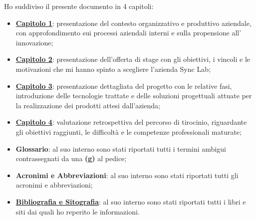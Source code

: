 \noindent Ho suddiviso il presente documento in 4 capitoli:
\begin{itemize}
  \item \hyperref[cap:contesto-aziendale]{\textbf{Capitolo 1}}: presentazione del contesto organizzativo e produttivo aziendale, con approfondimento sui processi aziendali interni e sulla propensione all' innovazione;

  \item \hyperref[cap:stage]{\textbf{Capitolo 2}}: presentazione dell'offerta di stage con gli obiettivi, i vincoli e le motivazioni che mi hanno spinto a scegliere l'azienda Sync Lab; 
  
  \item \hyperref[cap:nftlab]{\textbf{Capitolo 3}}: presentazione dettagliata del progetto con le relative fasi, introduzione delle tecnologie trattate e delle soluzioni progettuali attuate per la realizzazione dei prodotti attesi dall'azienda;
  
  \item \hyperref[cap:valutazione-finale]{\textbf{Capitolo 4}}: valutazione retrospettiva del percorso di tirocinio, riguardante gli obiettivi raggiunti, le difficoltà e le competenze professionali maturate;
  
  \item \textbf{Glossario}: al suo interno sono stati riportati tutti i termini ambigui contrassegnati da una \textbf{(g)} al pedice;
  
  \item \textbf{Acronimi e Abbreviazioni}: al suo interno sono stati riportati tutti gli acronimi e abbreviazioni;

  \item \hyperref[cap:bibliografia-sitografia]{\textbf{Bibliografia e Sitografia}}: al suo interno sono stati riportati tutti i libri e siti dai quali ho reperito le informazioni.
\end{itemize}

%
%

\endgroup

\vfill

